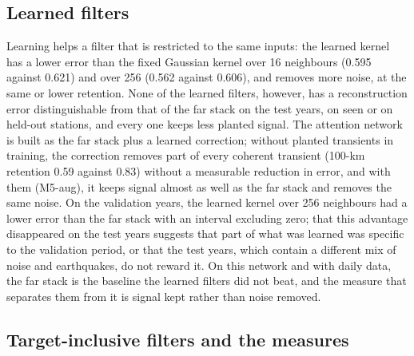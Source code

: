 \subsection{Learned filters}

Learning helps a filter that is restricted to the same inputs: the learned kernel has a lower error than the fixed Gaussian kernel over 16 neighbours (0.595 against 0.621) and over 256 (0.562 against 0.606), and removes more noise, at the same or lower retention. None of the learned filters, however, has a reconstruction error distinguishable from that of the far stack on the test years, on seen or on held-out stations, and every one keeps less planted signal. The attention network is built as the far stack plus a learned correction; without planted transients in training, the correction removes part of every coherent transient (100-km retention 0.59 against 0.83) without a measurable reduction in error, and with them (M5-aug), it keeps signal almost as well as the far stack and removes the same noise. On the validation years, the learned kernel over 256 neighbours had a lower error than the far stack with an interval excluding zero; that this advantage disappeared on the test years suggests that part of what was learned was specific to the validation period, or that the test years, which contain a different mix of noise and earthquakes, do not reward it. On this network and with daily data, the far stack is the baseline the learned filters did not beat, and the measure that separates them from it is signal kept rather than noise removed.

\subsection{Target-inclusive filters and the measures}

